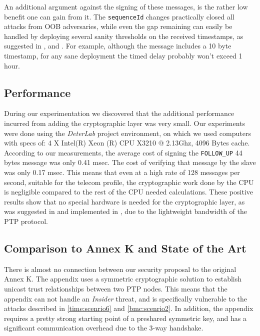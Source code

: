 \documentclass[11pt]{article}
\begin{document}
An additional argument against the signing of these messages, is the rather low benefit one can gain from it. The \texttt{sequenceId} changes practically closed all attacks from OOB adversaries, while even the gap remaining can easily be handled by deploying several sanity thresholds on the received timestamps, as suggested in \cite{Delay_Filter_1}, \cite{Delay_Filter_2} and \cite{game_theoretic}. For example, although the message includes a 10 byte timestamp, for any sane deployment the timed delay probably won't exceed 1 hour.



\subsection{Performance}\label{overview:perf}

During our experimentation we discovered that the additional performance incurred from adding the cryptographic layer was very small. Our experiments were done using the \emph{DeterLab} project environment, on which we used computers with specs of: 4 X Intel(R) Xeon (R) CPU X3210 @ 2.13Ghz, 4096 Bytes cache. According to our measurements, the average cost of signing the \texttt{FOLLOW_UP} 44 bytes message was only 0.41 msec. The cost of verifying that message by the slave was only 0.17 msec. This means that even at a high rate of 128 messages per second, suitable for the telecom profile, the cryptographic work done by the CPU is negligible compared to the rest of the CPU needed calculations. These positive results show that no special hardware is needed for the cryptographic layer, as was suggested in \cite{ISPCS_2012} and implemented in \cite{FPGA}, due to the lightweight bandwidth of the PTP protocol.



\subsection{Comparison to Annex K and State of the Art}\label{sol:appendix}

There is almost no connection between our security proposal to the original Annex K. The appendix uses a symmetric cryptographic solution to establish unicast trust relationships between two PTP nodes. This means that the appendix can not handle an \emph{Insider} threat, and is specifically vulnerable to the attacks described in \ref{time:scenrio6} and \ref{bmc:scenrio2}. In addition, the appendix requires a pretty strong starting point of a preshared symmetric key, and has a significant communication overhead due to the 3-way handshake.
\end{document}
